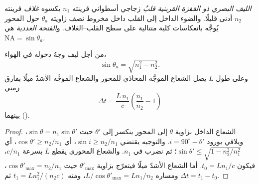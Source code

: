 \begin{definition}\label{def:b1:rays-reflection-refraction:fiber}
\emph{الليف البصري ذو القفزة القرينية} \emph{قلبٌ} زجاجي أسطواني
قرينته $n_1$ يكسوه \emph{غلاف} قرينته $n_2$ أدنى قليلًا.
والضوء الداخل إلى القلب داخل مخروط نصف زاويته $\theta_a$ حول
المحور يُوجَّه بانعكاسات كلية متتالية على سطح القلب--الغلاف.
و\emph{الفتحة العددية} هي $\mathrm{NA} = \sin\theta_a$.
\end{definition}

\begin{proposition}\label{prop:b1:rays-reflection-refraction:fiber}
من أجل ليف وجهُ دخوله في الهواء،
\[
\sin\theta_a = \sqrt{n_1^2 - n_2^2} .
\]
وعلى طول $L$ يصل الشعاع الموجَّه المحاذي للمحور والشعاع الموجَّه الأشدّ
ميلًا بفارق زمني
\[
\Delta t = \frac{L\,n_1}{c}\left(\frac{n_1}{n_2} - 1\right)
\]
بينهما (\emph{}).
\end{proposition}

\begin{proof}
الشعاع الداخل بزاوية $\theta$ إلى المحور ينكسر إلى $\theta'$
حيث $\sin\theta = n_1\sin\theta'$، ويلاقي  بورود
$i = 90^\circ - \theta'$. والتوجيه يقتضي $\sin i \geq n_2/n_1$، أي
$\cos\theta' \geq n_2/n_1$، أي $\sin\theta' \leq
\sqrt{1 - n_2^2/n_1^2}$؛ ثم نضرب في $n_1$. والشعاع المحوري يقطع $L$
بسرعة $c/n_1$، فيكون $t_0 = Ln_1/c$. أما الشعاع الأشدّ ميلًا فيتعرّج
بزاوية $\theta'_{\max}$ حيث $\cos\theta'_{\max} = n_2/n_1$، ومساره
$L/\cos\theta'_{\max} = L n_1/n_2$، ومنه $t_1 = L n_1^2/(n_2 c)$ ثم
$\Delta t = t_1 - t_0$.
\end{proof}

